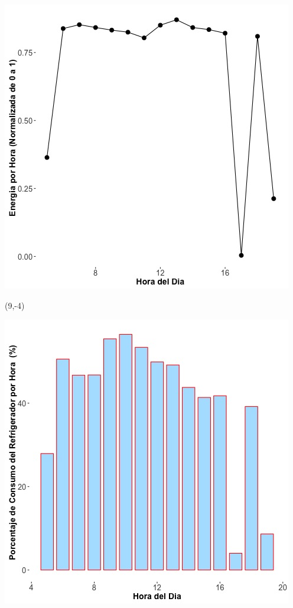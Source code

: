 \documentclass{article}\usepackage[]{graphicx}\usepackage[]{color}
\newenvironment{knitrout}{}{} %
\begin{document}
\begin{knitrout}
\color{fgcolor}
\includegraphics[scale=0.75]{figure/A25_fplot_norm_median} 
\end{knitrout}


 \begin{textblock}{1}(9,-4)
\begin{minipage}{20em}
\begingroup

\endgroup
\end{minipage}
\end{textblock}

 \vspace{2cm}

\begin{knitrout}
\color{fgcolor}
\includegraphics[scale=0.65]{figure/A25_fridge_energy_pct.jpg} 
\end{knitrout}
\end{document}
